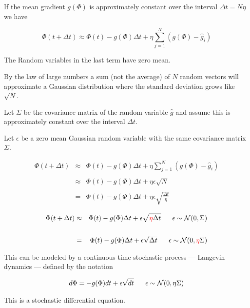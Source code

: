 {

If the mean gradient $g(\Phi)$ is approximately constant over the interval $\Delta t = N \eta$ we have

$$\Phi(t + \Delta t)  \approx \Phi(t) -g(\Phi)\Delta t + \eta \sum_{j=1}^N (g(\Phi) - \hat{g}_i)$$

\vfill
The Random variables in the last term have zero mean.

\vfill
By the law of large numbers a sum (not the average) of $N$ random vectors will approximate a Gaussian distribution where the standard deviation
grows like $\sqrt{N}$.


Let $\Sigma$ be the covariance matrix of the random variable $\hat{g}$ and assume this is approximately constant over the interval $\Delta t$.

\vfill
Let $\epsilon$ be a zero mean Gaussian random variable with the same covariance matrix $\Sigma$.

\begin{eqnarray*}
\Phi(t + \Delta t) & \approx & \Phi(t) -g(\Phi)\Delta t + \eta \sum_{j=1}^N (g(\Phi) - \hat{g}_i) \\
\\
& \approx & \Phi(t) -g(\Phi)\Delta t + \eta \epsilon \sqrt{N} \\
\\
& = & \Phi(t) -g(\Phi)\Delta t + \eta \epsilon \sqrt{\frac{\Delta t}{\eta}}
\end{eqnarray*}



\begin{eqnarray*}
\Phi(t + \Delta t) & \approx & \Phi(t) -g(\Phi)\Delta t + \epsilon \sqrt{{\color{red} \eta}\Delta t}\;\;\;\;\;\; \epsilon \sim {\cal N}(0,\Sigma) \\
\\
& = & \Phi(t) -g(\Phi)\Delta t + \epsilon \sqrt{\Delta t}\;\;\;\;\;\; \epsilon \sim {\cal N}(0,{\color{red} \eta}\Sigma)
\end{eqnarray*}

\vfill
This can be modeled by a continuous time stochastic process --- Langevin dynamics --- defined by the notation

{\color{red} $$d\Phi =  -g(\Phi)dt + \epsilon \sqrt{dt}\;\;\;\;\;\; \epsilon \sim {\cal N}(0,\eta\Sigma)$$}

\vfill
This is a stochastic differential equation.

}

